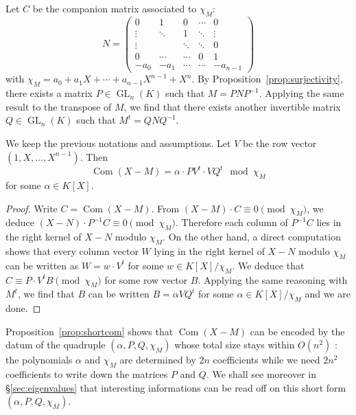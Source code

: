 \documentclass{sig-alternate-05-2015}
\DeclareMathOperator{\GL}{GL}
\DeclareMathOperator{\com}{Com}
\begin{document}
Let $C$ be the companion matrix associated to $\chi_M$:
\begin{equation}
\label{eq:companion}
N = \left( \begin{matrix}
0 & 1 & 0 & \cdots & 0 \\
\vdots & \ddots & 1 & \ddots & \vdots \\
\vdots & & \ddots & \ddots & 0 \\
0 & \cdots & \cdots & 0 & 1 \\
-a_0 & -a_1 & \cdots & \cdots & -a_{n-1}
\end{matrix} \right)
\end{equation}
with $\chi_M = a_0 + a_1 X + \cdots + a_{n-1} X^{n-1} + X^n$.
By Proposition~\ref{prop:surjectivity}, there exists a matrix 
$P \in \GL_n(K)$ such that $M = P N P^{-1}$. Applying the same
result to the transpose of $M$, we find that there exists another
invertible matrix $Q \in \GL_n(K)$ such that $M^t = Q N Q^{-1}$.

\begin{prop}
\label{prop:shortcom}
We keep the previous notations and assumptions.
Let $V$ be the row vector $(1, X, \ldots, X^{n-1})$. Then
\begin{equation}
\label{eq:shortcom}
\com(X{-}M) = \alpha \cdot P V^t \cdot V Q^t
\mod \chi_M
\end{equation}
for some $\alpha \in K[X]$.
\end{prop}

\begin{proof}
Write $C = \com(X{-}M)$. From $(X{-}M) \cdot C \equiv 0 
\pmod{\chi_M}$, we deduce $(X{-}N) \cdot P^{-1} C \equiv 0 \pmod{\chi_M}$. 
Therefore each column of $P^{-1} C$ lies in the right kernel of $X{-}N$
modulo $\chi_M$. On the other hand, a direct computation shows that
every column vector $W$ lying in the right kernel of $X{-}N$ modulo 
$\chi_M$ can be written as $W = w \cdot V^t$ for some $w \in 
K[X]/\chi_M$. We deduce that $C \equiv P \cdot V^t B \pmod{\chi_M}$
for some row vector $B$.
Applying the same reasoning with $M^t$, we find that $B$ can be
written $B = \alpha V Q^t$ for some $\alpha \in K[X]/\chi_M$ and
we are done.
\end{proof}

Proposition~\ref{prop:shortcom} shows that $\com(X{-}M)$ can be encoded 
by the datum of the quadruple $(\alpha, P, Q, \chi_M)$ whose total size 
stays within $O(n^2)$ : the polynomials $\alpha$ and $\chi_M$ are 
determined by $2n$ coefficients while we need $2n^2$ coefficients to 
write down the matrices $P$ and $Q$. 
We shall see moreover in \S \ref{sec:eigenvalues} that interesting
informations can be read off on this short form $(\alpha, P, Q, 
\chi_M)$.
\end{document}
